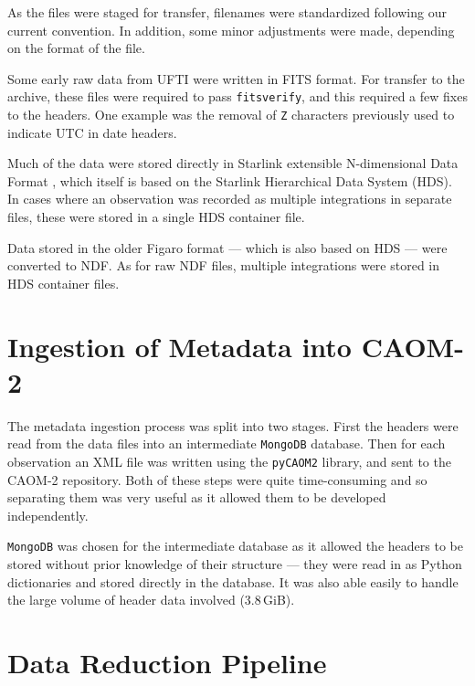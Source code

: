 \documentclass[11pt,twoside]{article}
\begin{document}
As the files were staged for transfer,
filenames were standardized following our current convention.
In addition,
some minor adjustments were made,
depending on the format of the file.


Some early raw data from UFTI were written in FITS format.
For transfer to the archive, these files were
required to pass
\texttt{fitsverify},
and this required a few fixes to the headers.
One example was the removal of \texttt{Z} characters
previously used to indicate UTC in date headers.


Much of the data were stored directly in
Starlink extensible N-dimensional Data Format
\citep[see for example,][]{P91_adassxxiii},
which itself is based on the
Starlink Hierarchical Data System (HDS).
In cases where an observation was recorded as
multiple integrations in separate files,
these were stored in a single HDS container file.


Data stored in the older Figaro format \citep{1993ASPC...52..219S}
--- which is also based on HDS ---
were converted to NDF.
As for raw NDF files, multiple integrations
were stored in HDS container files.

\section{Ingestion of Metadata into CAOM-2}

The metadata ingestion process was split into two stages.
First the headers were
read from the data files into an intermediate
\texttt{MongoDB} database.
Then for each observation an XML file was written
using the \texttt{pyCAOM2} library,
and sent to the CAOM-2 repository.
Both of these steps were quite time-consuming
and so separating them was very useful
as it allowed them to be developed
independently.

\texttt{MongoDB} was chosen for the intermediate database
as it allowed the
headers to be stored without prior knowledge of their structure
--- they were read in as Python dictionaries and
stored directly in the database.
It was also able easily to handle the large
volume of header data involved (3.8\,GiB).

\section{Data Reduction Pipeline}
\end{document}
